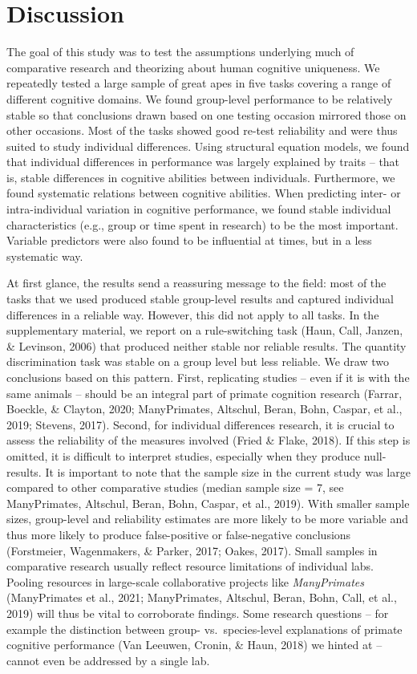 \documentclass[
  man,floatsintext]{apa6}
\begin{document}
\hypertarget{discussion}{%
\section{Discussion}\label{discussion}}

The goal of this study was to test the assumptions underlying much of comparative research and theorizing about human cognitive uniqueness. We repeatedly tested a large sample of great apes in five tasks covering a range of different cognitive domains. We found group-level performance to be relatively stable so that conclusions drawn based on one testing occasion mirrored those on other occasions. Most of the tasks showed good re-test reliability and were thus suited to study individual differences. Using structural equation models, we found that individual differences in performance was largely explained by traits -- that is, stable differences in cognitive abilities between individuals. Furthermore, we found systematic relations between cognitive abilities. When predicting inter- or intra-individual variation in cognitive performance, we found stable individual characteristics (e.g., group or time spent in research) to be the most important. Variable predictors were also found to be influential at times, but in a less systematic way.

At first glance, the results send a reassuring message to the field: most of the tasks that we used produced stable group-level results and captured individual differences in a reliable way. However, this did not apply to all tasks. In the supplementary material, we report on a rule-switching task (Haun, Call, Janzen, \& Levinson, 2006) that produced neither stable nor reliable results. The quantity discrimination task was stable on a group level but less reliable. We draw two conclusions based on this pattern. First, replicating studies -- even if it is with the same animals -- should be an integral part of primate cognition research (Farrar, Boeckle, \& Clayton, 2020; ManyPrimates, Altschul, Beran, Bohn, Caspar, et al., 2019; Stevens, 2017). Second, for individual differences research, it is crucial to assess the reliability of the measures involved (Fried \& Flake, 2018). If this step is omitted, it is difficult to interpret studies, especially when they produce null-results. It is important to note that the sample size in the current study was large compared to other comparative studies (median sample size = 7, see ManyPrimates, Altschul, Beran, Bohn, Caspar, et al., 2019). With smaller sample sizes, group-level and reliability estimates are more likely to be more variable and thus more likely to produce false-positive or false-negative conclusions (Forstmeier, Wagenmakers, \& Parker, 2017; Oakes, 2017). Small samples in comparative research usually reflect resource limitations of individual labs. Pooling resources in large-scale collaborative projects like \emph{ManyPrimates} (ManyPrimates et al., 2021; ManyPrimates, Altschul, Beran, Bohn, Call, et al., 2019) will thus be vital to corroborate findings. Some research questions -- for example the distinction between group- vs.~species-level explanations of primate cognitive performance (Van Leeuwen, Cronin, \& Haun, 2018) we hinted at -- cannot even be addressed by a single lab.
\end{document}
